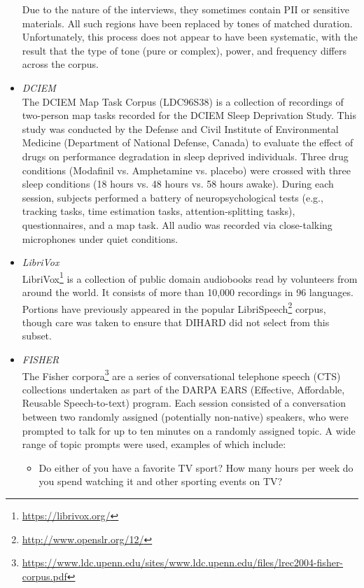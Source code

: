 \documentclass{article}
\begin{document}
\begin{appendices}
\begin{itemize}
            Due to the nature of the interviews, they sometimes contain PII or sensitive materials. All such regions have been replaced by tones of matched duration. Unfortunately, this process does not appear to have been systematic, with the result that the type of tone (pure or complex), power, and frequency differs across the corpus.
        \item {\it DCIEM} \\
            The DCIEM Map Task Corpus (LDC96S38) is a collection of recordings of two-person map tasks recorded for the DCIEM Sleep Deprivation Study. This study was conducted by the Defense and Civil Institute of Environmental  Medicine  (Department  of National  Defense,  Canada) to evaluate the effect of drugs on performance degradation in sleep deprived individuals. Three drug conditions (Modafinil vs. Amphetamine vs. placebo) were crossed with three sleep conditions (18 hours vs. 48 hours vs. 58 hours awake). During each session, subjects performed a battery of neuropsychological tests (e.g., tracking tasks, time estimation tasks, attention-splitting tasks), questionnaires, and a map task. All audio was recorded via close-talking microphones under quiet conditions.
        \item {\it LibriVox} \\
            LibriVox\footnote{\url{https://librivox.org/}} is a collection of public domain audiobooks read by volunteers from around the world. It consists of more than 10,000 recordings in 96 languages. Portions have previously appeared in the popular LibriSpeech\footnote{\url{http://www.openslr.org/12/}} corpus, though care was taken to ensure that DIHARD did not select from this subset.
        \item {\it FISHER} \\
            The Fisher corpora\footnote{\url{https://www.ldc.upenn.edu/sites/www.ldc.upenn.edu/files/lrec2004-fisher-corpus.pdf}} are a series of conversational telephone speech (CTS) collections undertaken as part of the DARPA EARS (Effective, Affordable, Reusable Speech-to-text) program. Each session consisted of a conversation between two randomly assigned (potentially non-native) speakers, who were prompted to talk for up to ten minutes on a randomly assigned topic. A wide range of topic prompts were used, examples of which include:
                \begin{itemize}
                    \item Do either of you have a favorite TV sport? How many hours per week do you spend watching it and other sporting events on TV?

\end{itemize}
\end{itemize}
\end{appendices}
\end{document}
